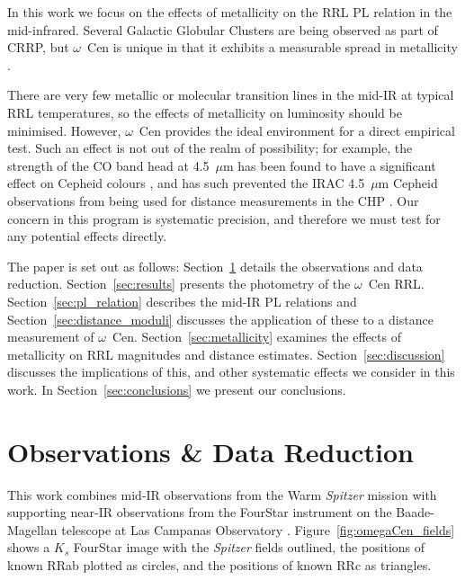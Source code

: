 \documentclass[a4paper,fleqn,usenatbib]{mnras}
\begin{document}
In this work we focus on the effects of metallicity on the RRL PL relation in the mid-infrared. Several Galactic Globular Clusters are being observed as part of CRRP, but $\omega$~Cen is unique in that it exhibits a measurable spread in metallicity \citep{1975ApJ...201L..71F, 2007ApJ...663..296V, 2014ApJ...791..107V}.

There are very few metallic or molecular transition lines in the mid-IR at typical RRL temperatures, so the effects of metallicity on luminosity should be minimised. However, $\omega$~Cen provides the ideal environment for a direct empirical test. Such an effect is not out of the realm of possibility; for example, the strength of the CO band head at 4.5~$\mu$m has been found to have a significant effect on Cepheid colours \citep{2010ApJ...709..120M}, and has such prevented the IRAC 4.5~$\mu$m Cepheid observations from being used for distance measurements in the CHP \citep{2011ApJ...743...76S, 2012ApJ...759..146M, 2016ApJ...816...49S}. Our concern in this program is systematic precision, and therefore we must test for any potential effects directly.

The paper is set out as follows: Section~\ref{sec:observations} details the observations and data reduction. Section~\ref{sec:results} presents the photometry of the $\omega$~Cen RRL. Section~\ref{sec:pl_relation} describes the mid-IR PL relations and Section~\ref{sec:distance_moduli} discusses the application of these to a distance measurement of  $\omega$~Cen. Section~\ref{sec:metallicity} examines the effects of metallicity on RRL magnitudes and distance estimates. Section~\ref{sec:discussion} discusses the implications of this, and other systematic effects we consider in this work. In Section~\ref{sec:conclusions} we present our conclusions.

\section{Observations \& Data Reduction}
\label{sec:observations}
This work combines mid-IR observations from the Warm {\it Spitzer} mission \citep[][PID 90002]{2012sptz.prop90002F} with supporting near-IR observations from the FourStar instrument on the Baade-Magellan telescope at Las Campanas Observatory \citep{2013PASP..125..654P}. Figure~\ref{fig:omegaCen_fields} shows a $K_s$ FourStar image with the {\it Spitzer} fields outlined, the positions of known RRab plotted as circles, and the positions of known RRc as triangles.
\end{document}
